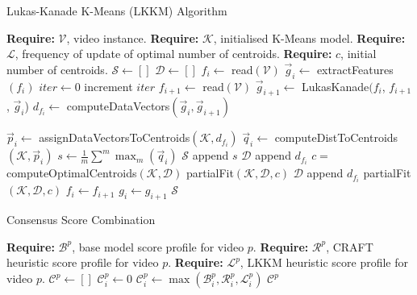 \documentclass[sigplan,authorversion,nonacm, 9pt]{acmart}
\begin{document}
\newpage
\FloatBarrier
\begin{algorithm*} \label{fig:psLKKM}
	\caption{Lukas-Kanade K-Means (LKKM) Algorithm} 
	
	\begin{algorithmic}[1]
	\State \textbf{Require:} $\mathcal{V}$, video instance.
	\State \textbf{Require:} $\mathcal{K}$, initialised K-Means model.
	\State \textbf{Require:} $\mathcal{L}$, frequency of update of optimal number of centroids.
	\State \textbf{Require:} $c$, initial number of centroids. 
	\State $\mathcal{S} \leftarrow []$
	\State $\mathcal{D} \leftarrow []$
	\State $f_{i} \leftarrow$ read$(\mathcal{V})$
	\State $\vec{g}_{i} \leftarrow$ extractFeatures$(f_{i})$  
	\State $iter \leftarrow 0$
	\State increment $iter$
    \State $f_{i+1} \leftarrow$ read$(\mathcal{V})$
    \State $\vec{g}_{i+1} \leftarrow$ LukasKanade$(f_i$, $f_{i+1}$, $\vec{g}_i$)
    \State $d_{f_{i}} \leftarrow$ computeDataVectors$(\vec{g}_i, \vec{g}_{i+1})$
        
        \State $\vec{p}_{i} \leftarrow$ assignDataVectorsToCentroids$(\mathcal{K}, d_{f_{i}})$
        \State $\vec{q}_{i} \leftarrow$ computeDistToCentroids$(\mathcal{K},  \vec{p}_{i})$
        \State $s \leftarrow \frac{1}{m}  \sum^{m} \max_{m}(\vec{q}_{i})$
        \State $\mathcal{S}$ append $s$
        \State $\mathcal{D}$ append $d_{f_{i}}$
            \State $c =$ computeOptimalCentroids$(\mathcal{K},\mathcal{D})$
        \EndIf
        \State partialFit$(\mathcal{K}, \mathcal{D}, c)$
    \Else
        \State $\mathcal{D}$ append $d_{f_{i}}$ 
        \State partialFit$(\mathcal{K}, \mathcal{D}, c)$
    \EndIf
    \State $f_{i} \leftarrow f_{i+1}$
    \State $g_{i} \leftarrow g_{i+1}$
	\EndWhile
	\State \Return $\mathcal{S}$
	\end{algorithmic} 
\end{algorithm*}
\newpage
\FloatBarrier
\begin{algorithm*} \label{fig:psCON}
	\caption{Consensus Score Combination} 
	\begin{algorithmic}[1]
	\State \textbf{Require:} $\mathcal{B}^{p}$, base model score profile for video $p$.   
	\State \textbf{Require:} $\mathcal{R}^{p}$, CRAFT heuristic score profile for video $p$. 
	\State \textbf{Require:} $\mathcal{L}^{p}$, LKKM heuristic score profile for video $p$. 
	\State $\mathcal{C}^{p} \leftarrow []$
	        \State $\mathcal{C}_{i}^{p} \leftarrow 0$
        \Else
	        \State $\mathcal{C}_{i}^{p} \leftarrow \max (\mathcal{B}_{i}^{p}, \mathcal{R}_{i}^{p}, \mathcal{L}_{i}^{p})$
        \EndIf
    \EndFor
    \State \Return $\mathcal{C}^{p}$
	\end{algorithmic} 
\end{algorithm*}

\end{document}
